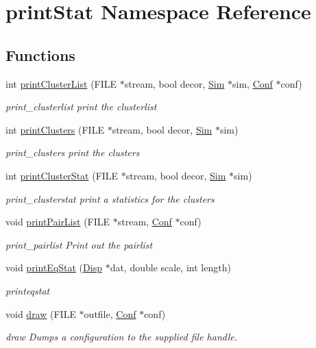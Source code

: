 \hypertarget{namespaceprint_stat}{\section{print\+Stat Namespace Reference}
\label{namespaceprint_stat}
}
\subsection*{Functions}
\begin{DoxyCompactItemize}
\item 
int \hyperlink{namespaceprint_stat_a14daf62b11779bc1d5703953c7fe6c5e}{print\+Cluster\+List} (F\+I\+L\+E $\ast$stream, bool decor, \hyperlink{struct_sim}{Sim} $\ast$sim, \hyperlink{class_conf}{Conf} $\ast$conf)
\begin{DoxyCompactList}\small\item\em print\+\_\+clusterlist print the clusterlist \end{DoxyCompactList}\item 
int \hyperlink{namespaceprint_stat_a677d67d06c5e94575cf134f62b8931ca}{print\+Clusters} (F\+I\+L\+E $\ast$stream, bool decor, \hyperlink{struct_sim}{Sim} $\ast$sim)
\begin{DoxyCompactList}\small\item\em print\+\_\+clusters print the clusters \end{DoxyCompactList}\item 
int \hyperlink{namespaceprint_stat_a0b43e80734258424961c75c73a97ad6c}{print\+Cluster\+Stat} (F\+I\+L\+E $\ast$stream, bool decor, \hyperlink{struct_sim}{Sim} $\ast$sim)
\begin{DoxyCompactList}\small\item\em print\+\_\+clusterstat print a statistics for the clusters \end{DoxyCompactList}\item 
void \hyperlink{namespaceprint_stat_a323ee54f7e5beb4c642569cb07aa37ce}{print\+Pair\+List} (F\+I\+L\+E $\ast$stream, \hyperlink{class_conf}{Conf} $\ast$conf)
\begin{DoxyCompactList}\small\item\em print\+\_\+pairlist Print out the pairlist \end{DoxyCompactList}\item 
void \hyperlink{namespaceprint_stat_a8170440b42d61f528a874c4d763609f7}{print\+Eq\+Stat} (\hyperlink{struct_disp}{Disp} $\ast$dat, double scale, int length)
\begin{DoxyCompactList}\small\item\em printeqstat \end{DoxyCompactList}\item 
void \hyperlink{namespaceprint_stat_a07c0632a1accc08bdfc3990a9110e95b}{draw} (F\+I\+L\+E $\ast$outfile, \hyperlink{class_conf}{Conf} $\ast$conf)
\begin{DoxyCompactList}\small\item\em draw Dumps a configuration to the supplied file handle. \end{DoxyCompactList}\end{DoxyCompactItemize}


